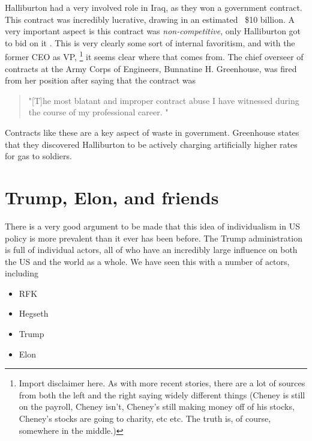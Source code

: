 \documentclass{article}
\begin{document}
        Halliburton had a very involved role in Iraq, as they won a government contract. This contract was incredibly lucrative, drawing in an estimated ~\$10 billion. A very important aspect is this contract was \textit{non-competitive}, only Halliburton got to bid on it \cite{bbc2008iraqcontracts}. This is very clearly some sort of internal favoritism, and with the former CEO as VP,
        \footnote{Import disclaimer here. As with more recent stories, there are a lot of sources from both the left and the right saying widely different things (Cheney is still on the payroll, Cheney 
        isn't, Cheney's still making money off of his stocks, Cheney's stocks are going to charity, etc etc. The truth is, of course, somewhere in the middle.)}
        it seems clear where that comes from. The chief overseer of contracts at the Army Corps of Engineers, Bunnatine H. Greenhouse, was fired from her position after saying that the contract was 
        \begin{quote}
            "[T]he most blatant and improper contract abuse I have witnessed during the course of my professional career. \cite{nytimes2005halliburtoncontract}"
        \end{quote}  
        Contracts like these are a key aspect of waste in government. Greenhouse states that they discovered Halliburton to be actively charging artificially higher rates for gas to soldiers. \cite{nytimes2005halliburtoncontract}
        
        

\section{Trump, Elon, and friends}
    There is a very good argument to be made that this idea of individualism in US policy is more prevalent than it ever has been before. The Trump administration is full of individual actors, all of who have an incredibly large influence on both the US and the world as a whole. We have seen this with a number of actors, including 
    \begin{itemize}
        \item RFK
        \item Hegseth 
        \item Trump
        \item Elon
    \end{itemize}

\pagebreak
\printbibliography[
    heading=bibintoc,
    title={\centering Sources}
    ]

    
\end{document}
